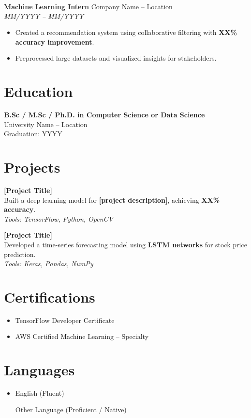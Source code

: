 \documentclass[a4paper,10pt]{article}
\begin{document}
\vspace{0.2cm}

\textbf{Machine Learning Intern} \hfill Company Name -- Location \\
\textit{MM/YYYY -- MM/YYYY}
\begin{itemize}[leftmargin=*, noitemsep]
    \item Created a recommendation system using collaborative filtering with \textbf{XX\% accuracy improvement}.
    \item Preprocessed large datasets and visualized insights for stakeholders.
\end{itemize}

\section*{Education}
\textbf{B.Sc / M.Sc / Ph.D. in Computer Science or Data Science} \\
University Name -- Location \\
Graduation: YYYY

\section*{Projects}

\textbf{[Project Title]} \\
Built a deep learning model for \textbf{[project description]}, achieving \textbf{XX\% accuracy}. \\
\textit{Tools: TensorFlow, Python, OpenCV}

\vspace{0.2cm}

\textbf{[Project Title]} \\
Developed a time-series forecasting model using \textbf{LSTM networks} for stock price prediction. \\
\textit{Tools: Keras, Pandas, NumPy}

\section*{Certifications}
\begin{itemize}[leftmargin=*, noitemsep]
    \item TensorFlow Developer Certificate
    \item AWS Certified Machine Learning -- Specialty
\end{itemize}

\section*{Languages}
\begin{itemize}[leftmargin=*, noitemsep]
    \item English (Fluent)
    \item [Other Language] (Proficient / Native)
\end{itemize}
\end{document}
